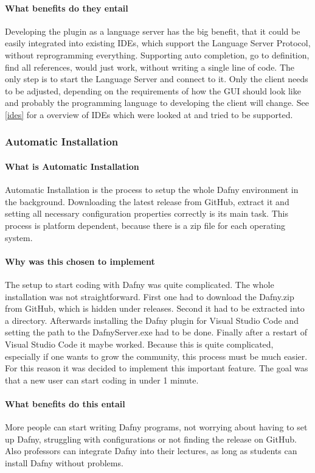 \paragraph{What benefits do they entail}
Developing the plugin as a language server has the big benefit, that it could be easily integrated into existing IDEs, which support the Language Server Protocol, without reprogramming everything. Supporting auto completion, go to definition, find all references, would just work, without writing a single line of code. The only step is to start the Language Server and connect to it. Only the client needs to be adjusted, depending on the requirements of how the GUI should look like and probably the programming language to developing the client will change. 
See \ref{ides} for a overview of IDEs which were looked at and tried to be supported. 
\subsubsection{Automatic Installation} \label{setupAutomaticInstallation}
\paragraph{What is Automatic Installation}
Automatic Installation is the process to setup the whole Dafny environment in the background. Downloading the latest release from GitHub, extract it and setting all necessary configuration properties correctly is its main task. This process is platform dependent, because there is a zip file for each operating system. 
\paragraph{Why was this chosen to implement}
The setup to start coding with Dafny was quite complicated. The whole installation was not straightforward. First one had to download the Dafny.zip from GitHub, which is hidden under releases. Second it had to be extracted into a directory. Afterwards installing the Dafny plugin for Visual Studio Code and setting the path to the DafnyServer.exe had to be done. Finally after a restart of Visual Studio Code it maybe worked. \newline
Because this is quite complicated, especially if one wants to grow the community, this process must be much easier. For this reason it was decided to implement this important feature. The goal was that a new user can start coding in under 1 minute. 
\paragraph{What benefits do this entail}
More people can start writing Dafny programs, not worrying about having to set up Dafny, struggling with configurations or not finding the release on GitHub. Also professors can integrate Dafny into their lectures, as long as students can install Dafny without problems. 
